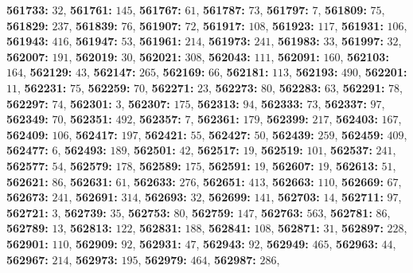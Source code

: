 \textsf{\bfseries 561733:} $32$, \textsf{\bfseries 561761:} $145$, \textsf{\bfseries 561767:} $61$, \textsf{\bfseries 561787:} $73$, \textsf{\bfseries 561797:} $7$, \textsf{\bfseries 561809:} $75$, \textsf{\bfseries 561829:} $237$, \textsf{\bfseries 561839:} $76$, \textsf{\bfseries 561907:} $72$, \textsf{\bfseries 561917:} $108$, \textsf{\bfseries 561923:} $117$, \textsf{\bfseries 561931:} $106$, \textsf{\bfseries 561943:} $416$, \textsf{\bfseries 561947:} $53$, \textsf{\bfseries 561961:} $214$, \textsf{\bfseries 561973:} $241$, \textsf{\bfseries 561983:} $33$, \textsf{\bfseries 561997:} $32$, \textsf{\bfseries 562007:} $191$, \textsf{\bfseries 562019:} $30$, \textsf{\bfseries 562021:} $308$, \textsf{\bfseries 562043:} $111$, \textsf{\bfseries 562091:} $160$, \textsf{\bfseries 562103:} $164$, \textsf{\bfseries 562129:} $43$, \textsf{\bfseries 562147:} $265$, \textsf{\bfseries 562169:} $66$, \textsf{\bfseries 562181:} $113$, \textsf{\bfseries 562193:} $490$, \textsf{\bfseries 562201:} $11$, \textsf{\bfseries 562231:} $75$, \textsf{\bfseries 562259:} $70$, \textsf{\bfseries 562271:} $23$, \textsf{\bfseries 562273:} $80$, \textsf{\bfseries 562283:} $63$, \textsf{\bfseries 562291:} $78$, \textsf{\bfseries 562297:} $74$, \textsf{\bfseries 562301:} $3$, \textsf{\bfseries 562307:} $175$, \textsf{\bfseries 562313:} $94$, \textsf{\bfseries 562333:} $73$, \textsf{\bfseries 562337:} $97$, \textsf{\bfseries 562349:} $70$, \textsf{\bfseries 562351:} $492$, \textsf{\bfseries 562357:} $7$, \textsf{\bfseries 562361:} $179$, \textsf{\bfseries 562399:} $217$, \textsf{\bfseries 562403:} $167$, \textsf{\bfseries 562409:} $106$, \textsf{\bfseries 562417:} $197$, \textsf{\bfseries 562421:} $55$, \textsf{\bfseries 562427:} $50$, \textsf{\bfseries 562439:} $259$, \textsf{\bfseries 562459:} $409$, \textsf{\bfseries 562477:} $6$, \textsf{\bfseries 562493:} $189$, \textsf{\bfseries 562501:} $42$, \textsf{\bfseries 562517:} $19$, \textsf{\bfseries 562519:} $101$, \textsf{\bfseries 562537:} $241$, \textsf{\bfseries 562577:} $54$, \textsf{\bfseries 562579:} $178$, \textsf{\bfseries 562589:} $175$, \textsf{\bfseries 562591:} $19$, \textsf{\bfseries 562607:} $19$, \textsf{\bfseries 562613:} $51$, \textsf{\bfseries 562621:} $86$, \textsf{\bfseries 562631:} $61$, \textsf{\bfseries 562633:} $276$, \textsf{\bfseries 562651:} $413$, \textsf{\bfseries 562663:} $110$, \textsf{\bfseries 562669:} $67$, \textsf{\bfseries 562673:} $241$, \textsf{\bfseries 562691:} $314$, \textsf{\bfseries 562693:} $32$, \textsf{\bfseries 562699:} $141$, \textsf{\bfseries 562703:} $14$, \textsf{\bfseries 562711:} $97$, \textsf{\bfseries 562721:} $3$, \textsf{\bfseries 562739:} $35$, \textsf{\bfseries 562753:} $80$, \textsf{\bfseries 562759:} $147$, \textsf{\bfseries 562763:} $563$, \textsf{\bfseries 562781:} $86$, \textsf{\bfseries 562789:} $13$, \textsf{\bfseries 562813:} $122$, \textsf{\bfseries 562831:} $188$, \textsf{\bfseries 562841:} $108$, \textsf{\bfseries 562871:} $31$, \textsf{\bfseries 562897:} $228$, \textsf{\bfseries 562901:} $110$, \textsf{\bfseries 562909:} $92$, \textsf{\bfseries 562931:} $47$, \textsf{\bfseries 562943:} $92$, \textsf{\bfseries 562949:} $465$, \textsf{\bfseries 562963:} $44$, \textsf{\bfseries 562967:} $214$, \textsf{\bfseries 562973:} $195$, \textsf{\bfseries 562979:} $464$, \textsf{\bfseries 562987:} $286$, 

